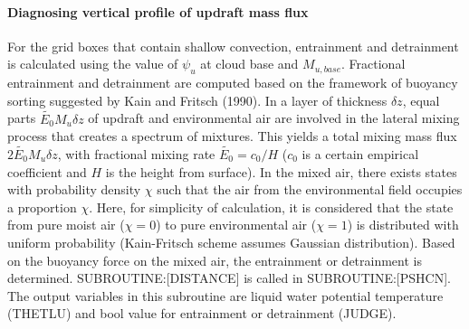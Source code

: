 \paragraph{Diagnosing vertical profile of updraft mass flux}\label{diagnosing-vertical-profile-of-updraft-mass-flux}

For the grid boxes that contain shallow convection, entrainment and detrainment is calculated using the value of $\psi_u$ at cloud base and $M_{u,base}$.
Fractional entrainment and detrainment are computed based on the framework of buoyancy sorting suggested by Kain and Fritsch (1990).
In a layer of thickness $\delta z$, equal parts $\tilde{E_0} M_u \delta z$ of updraft and environmental air are involved in the lateral mixing process that creates a spectrum of mixtures.
This yields a total mixing mass flux $2\tilde{E_0} M_u \delta z$, with fractional mixing rate $\tilde{E_0}=c_0/H$ ($c_0$ is a certain empirical coefficient and $H$ is the height from surface).
In the mixed air, there exists states with probability density $\chi$ such that the air from the environmental field occupies a proportion $\chi$. Here, for simplicity of calculation, 
it is considered that the state from pure moist air ($\chi=0$) to pure environmental air ($\chi=1$) is distributed with uniform probability (Kain-Fritsch scheme assumes Gaussian distribution).
Based on the buoyancy force on the mixed air, the entrainment or detrainment is determined. SUBROUTINE:[DISTANCE] is called in SUBROUTINE:[PSHCN].
The output variables in this subroutine are liquid water potential temperature (THETLU) and bool value for entrainment or detrainment (JUDGE).

